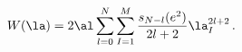 \begin{equation}
W(\la)=2\al \sum_{l=0}^{N} \sum_{I=1}^{M}\frac{s_{N-l}(e^2)}{2l+2} \la%
_I^{2l+2} \, .  \label{SUPER}
\end{equation}

